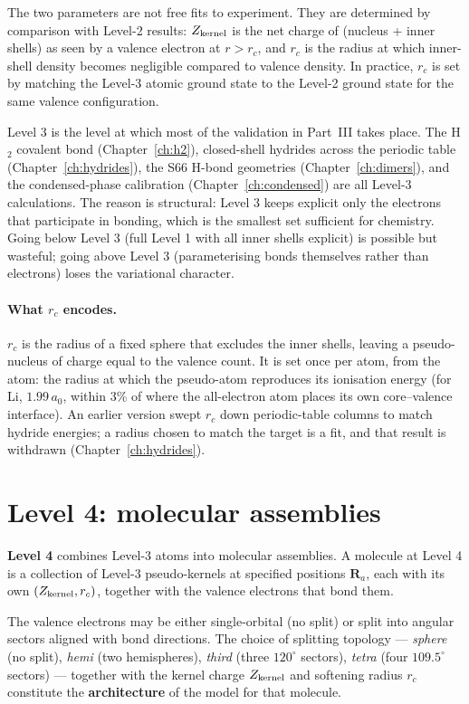The two parameters are not free fits to experiment. They are determined by comparison with Level-2 results: $Z_{\rm kernel}$ is the net charge of (nucleus + inner shells) as seen by a valence electron at $r > r_c$, and $r_c$ is the radius at which inner-shell density becomes negligible compared to valence density. In practice, $r_c$ is set by matching the Level-3 atomic ground state to the Level-2 ground state for the same valence configuration.

Level 3 is the level at which most of the validation in Part~III takes place. The H$_2$ covalent bond (Chapter~\ref{ch:h2}), closed-shell hydrides across the periodic table (Chapter~\ref{ch:hydrides}), the S66 H-bond geometries (Chapter~\ref{ch:dimers}), and the condensed-phase calibration (Chapter~\ref{ch:condensed}) are all Level-3 calculations. The reason is structural: Level 3 keeps explicit only the electrons that participate in bonding, which is the smallest set sufficient for chemistry. Going below Level 3 (full Level 1 with all inner shells explicit) is possible but wasteful; going above Level 3 (parameterising bonds themselves rather than electrons) loses the variational character.

\paragraph{What $r_c$ encodes.} $r_c$ is the radius of a fixed sphere that excludes the inner shells,
leaving a pseudo-nucleus of charge equal to the valence count. It is set once per atom, from the atom:
the radius at which the pseudo-atom reproduces its ionisation energy (for Li, $1.99\,a_0$, within 3\% of
where the all-electron atom places its own core--valence interface). An earlier version swept $r_c$
down periodic-table columns to match hydride energies; a radius chosen to match the target is a fit,
and that result is withdrawn (Chapter~\ref{ch:hydrides}).

\section{Level 4: molecular assemblies}\label{sec:level4}

\textbf{Level 4} combines Level-3 atoms into molecular assemblies. A molecule at Level 4 is a collection of Level-3 pseudo-kernels at specified positions $\mathbf{R}_a$, each with its own $(Z_{\rm kernel}, r_c)$, together with the valence electrons that bond them.

The valence electrons may be either single-orbital (no split) or split into angular sectors aligned with bond directions. The choice of splitting topology --- \emph{sphere} (no split), \emph{hemi} (two hemispheres), \emph{third} (three $120^\circ$ sectors), \emph{tetra} (four $109.5^\circ$ sectors) --- together with the kernel charge $Z_{\rm kernel}$ and softening radius $r_c$ constitute the \textbf{architecture} of the model for that molecule.

